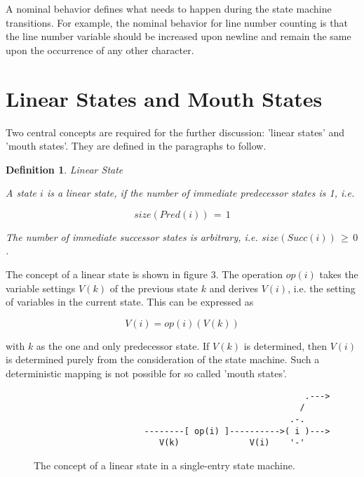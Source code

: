 \documentclass[12pt,a4paper]{scrartcl}
\newtheorem{definition}{Definition}
\begin{document}
A nominal behavior defines what needs to happen during the state machine
transitions.  For example, the nominal behavior for line number counting is
that the line number variable should be increased upon newline and remain the
same upon the occurrence of any other character. 


%
\section{Linear States and Mouth States}

Two central concepts are required for the further discussion: 'linear states' and 'mouth
states'.  They are defined in the paragraphs to follow. 

\begin{definition}
Linear State

A state $i$ is a linear state, if the number of immediate predecessor states is
1, i.e. 

\begin{equation}
                           size(Pred(i))\,=\,1
\end{equation}

The number of immediate successor states is arbitrary, i.e.
$size(Succ(i))\,\ge\,0$.

\end{definition}

The concept of a linear state is shown in figure 3. The operation $op(i)$ takes
the variable settings $V(k)$ of the previous state $k$ and derives $V(i)$, i.e.
the setting of variables in the current state. This can be expressed as 

\begin{equation} \label{eq:accumulation}
            V(i) = op(i)(V(k))                                         
\end{equation}

with $k$ as the one and only predecessor state. If $V(k)$ is determined, then
$V(i)$ is determined purely from the consideration of the state machine. Such a
deterministic mapping is not possible for so called 'mouth states'.

\begin{figure}[htbp] \leavevmode
\begin{verbatim}
                                                      .---> 
                                                     /
                                                   .-.
                      --------[ op(i) ]---------->( i )---> 
                         V(k)              V(i)    '-'

\end{verbatim}
\caption{The concept of a linear state in a single-entry state machine.}
\end{figure}
\end{document}
